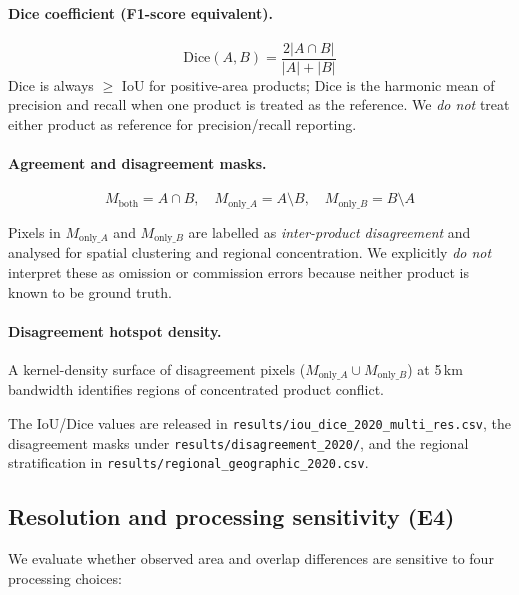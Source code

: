 \documentclass[11pt]{article}
\begin{document}
\paragraph{Dice coefficient (F1-score equivalent).}
\begin{equation}
\text{Dice}(A, B) = \frac{2|A \cap B|}{|A| + |B|}
\label{eq:dice}
\end{equation}
Dice is always $\geq$ IoU for positive-area products; Dice is the harmonic mean
of precision and recall when one product is treated as the reference. We \emph{do
not} treat either product as reference for precision/recall reporting.

\paragraph{Agreement and disagreement masks.}
\begin{equation}
M_{\text{both}} = A \cap B, \quad
M_{\text{only}\_A} = A \setminus B, \quad
M_{\text{only}\_B} = B \setminus A
\label{eq:masks}
\end{equation}

Pixels in $M_{\text{only}\_A}$ and $M_{\text{only}\_B}$ are labelled as
\emph{inter-product disagreement} and analysed for spatial clustering and
regional concentration. We explicitly \emph{do not} interpret these as omission
or commission errors because neither product is known to be ground truth.

\paragraph{Disagreement hotspot density.}
A kernel-density surface of disagreement pixels ($M_{\text{only}\_A} \cup
M_{\text{only}\_B}$) at 5\,km bandwidth identifies regions of concentrated
product conflict.

The IoU/Dice values are released in
\texttt{results/iou\_dice\_2020\_multi\_res.csv}, the disagreement masks under
\texttt{results/disagreement\_2020/}, and the regional stratification in
\texttt{results/regional\_geographic\_2020.csv}.

\subsection{Resolution and processing sensitivity (E4)}

We evaluate whether observed area and overlap differences are sensitive to
four processing choices:
\end{document}

